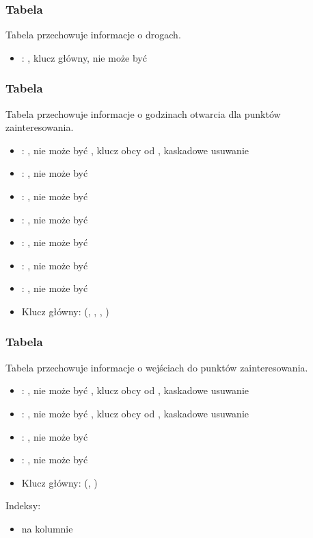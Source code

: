 \subsubsection{Tabela }
Tabela przechowuje informacje o drogach.
\begin{itemize}
    \item {}: , klucz główny, nie może być 
\end{itemize}

\subsubsection{Tabela }
Tabela przechowuje informacje o godzinach otwarcia dla punktów zainteresowania.
\begin{itemize}
    \item {}: , nie może być , klucz obcy od , kaskadowe usuwanie
    \item {}: , nie może być 
    \item {}: , nie może być 
    \item {}: , nie może być 
    \item {}: , nie może być 
    \item {}: , nie może być 
    \item {}: , nie może być 
    \item Klucz główny: (, , , )
\end{itemize}

\subsubsection{Tabela }
Tabela przechowuje informacje o wejściach do punktów zainteresowania.
\begin{itemize}
    \item {}: , nie może być , klucz obcy od , kaskadowe usuwanie
    \item {}: , nie może być , klucz obcy od , kaskadowe usuwanie
    \item {}: , nie może być 
    \item {}: , nie może być 
    \item Klucz główny: (, )
\end{itemize}
Indeksy:
\begin{itemize}
    \item {} na kolumnie 
\end{itemize}

